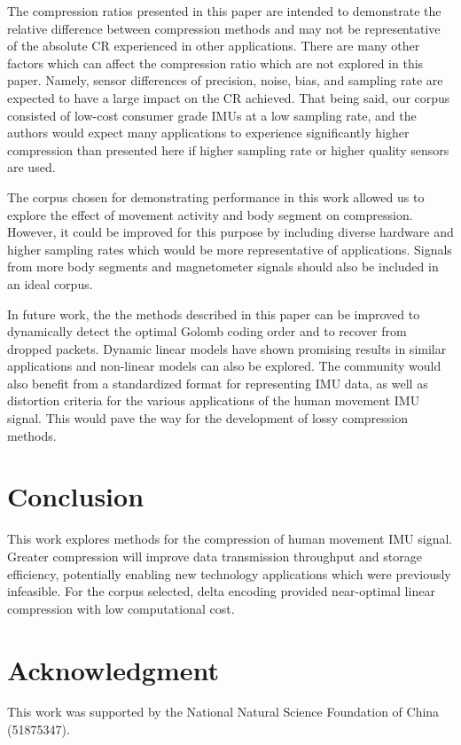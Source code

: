 \documentclass[journal]{IEEEtran}
\begin{document}
The compression ratios presented in this paper are intended to demonstrate the relative difference between compression methods and may not be representative of the absolute CR experienced in other applications. There are many other factors which can affect the compression ratio which are not explored in this paper. Namely, sensor differences of precision, noise, bias, and sampling rate are expected to have a large impact on the CR achieved. That being said, our corpus consisted of low-cost consumer grade IMUs at a low sampling rate, and the authors would expect many applications to experience significantly higher compression than presented here if higher sampling rate or higher quality sensors are used.

The corpus chosen for demonstrating performance in this work allowed us to explore the effect of movement activity and body segment on compression. However, it could be improved for this purpose by including diverse hardware and higher sampling rates which would be more representative of applications. Signals from more body segments and magnetometer signals should also be included in an ideal corpus.

In future work, the the methods described in this paper can be improved to dynamically detect the optimal Golomb coding order and to recover from dropped packets. Dynamic linear models have shown promising results in similar applications \cite{Blalock2018} and non-linear models can also be explored. The community would also benefit from a standardized format for representing IMU data, as well as distortion criteria for the various applications of the human movement IMU signal. This would pave the way for the development of lossy compression methods.


\section{Conclusion}
This work explores methods for the compression of human movement IMU signal. Greater compression will improve data transmission throughput and storage efficiency, potentially enabling new technology applications which were previously infeasible. For the corpus selected, delta encoding provided near-optimal linear compression with low computational cost.

\section*{Acknowledgment}
This work was supported by the National Natural Science
Foundation of China (51875347).
\end{document}
